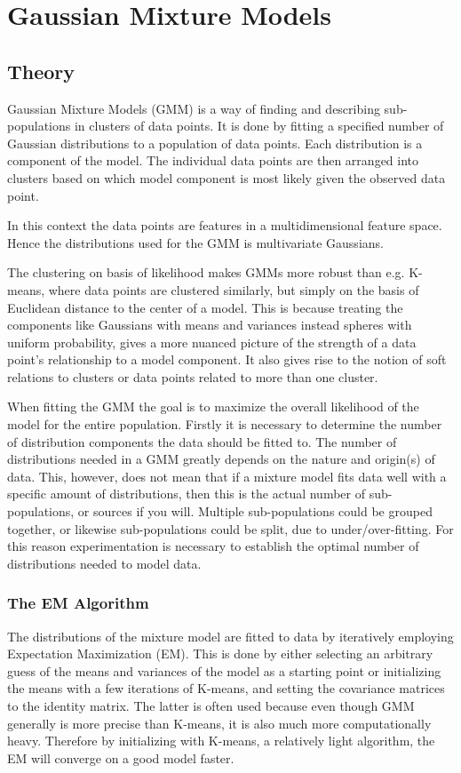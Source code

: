 \chapter{Gaussian Mixture Models}
\section{Theory}

Gaussian Mixture Models (GMM) is a way of finding and describing sub-populations in clusters of data points. 
It is done by fitting a specified number of Gaussian distributions to a population of data points.
Each distribution is a component of the model. 
The individual data points are then arranged into clusters based on which model component is most likely given the observed data point.

In this context the data points are features in a multidimensional feature space. Hence the distributions used for the GMM is multivariate Gaussians.

The clustering on basis of likelihood makes GMMs more robust than e.g. K-means, where data points are clustered similarly, but simply on the basis of Euclidean distance to the center of a model. 
This is because treating the components like Gaussians with means and variances instead spheres with uniform probability, gives a more nuanced picture of the strength of a data point’s relationship to a model component. 
It also gives rise to the notion of soft relations to clusters or data points related to more than one cluster.

When fitting the GMM the goal is to maximize the overall likelihood of the model for the entire population.
Firstly it is necessary to determine the number of distribution components the data should be fitted to. 
The number of distributions needed in a GMM greatly depends on the nature and origin(s)
of data.
This, however, does not mean that if a mixture model fits data well with a specific amount of distributions, then this is the actual number of sub-populations, or sources if you will.
Multiple sub-populations could be grouped together, or likewise sub-populations could be split, due to under/over-fitting.
For this reason experimentation is necessary to establish the optimal number of distributions needed to model data.




\subsection{The EM Algorithm}
The distributions of the mixture model are fitted to data by iteratively employing Expectation Maximization (EM).
This is done by either selecting an arbitrary guess of the means and variances of the model as a starting point or initializing the means with a few iterations of K-means, and setting the covariance matrices to the identity matrix. 
The latter is often used because even though GMM generally is more precise than K-means, it is also much more computationally heavy.
Therefore by initializing with K-means, a relatively light algorithm, the EM will converge on a good model faster.

